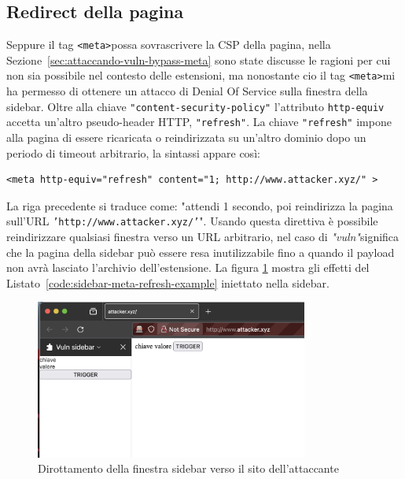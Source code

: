 \documentclass{sapthesis}
\newcommand{\code}[1]{\texttt{#1}}
\newcommand{\refSection}[1]{Sezione~\ref{#1}}
\newcommand{\refCode}[1]{Listato~\ref{#1}}
\newcommand{\vuln}{\textit{"vuln"}}
\newcommand{\tagHTML}[1]{\code{<#1>}}
\newcommand{\meta}{\tagHTML{meta}}
\begin{document}
        \subsection{Redirect della pagina}
            Seppure il tag \meta possa sovrascrivere la CSP della pagina, nella \refSection{sec:attaccando-vuln-bypass-meta}
            sono state discusse le ragioni per cui non sia possibile nel contesto delle estensioni, ma
            nonostante cio il tag \meta mi ha permesso di ottenere un attacco di Denial Of Service sulla finestra 
            della sidebar. Oltre alla chiave \code{"content-security-policy"}
            l'attributo \code{http-equiv} accetta un'altro pseudo-header HTTP, \code{"refresh"}. La chiave
            \code{"refresh"} impone alla pagina di essere ricaricata o reindirizzata su un'altro dominio dopo
            un periodo di timeout arbitrario, la sintassi appare così:
            \begin{lstlisting}[label=code:sidebar-meta-refresh-example]
                <meta http-equiv="refresh" content="1; http://www.attacker.xyz/" >
            \end{lstlisting}
            La riga precedente si traduce come: "attendi 1 secondo, poi reindirizza la pagina sull'URL 
            \code{'http://www.attacker.xyz/'}".
            Usando questa direttiva è possibile reindirizzare qualsiasi finestra verso un URL arbitrario,
            nel caso di \vuln significa che la pagina della sidebar può essere resa inutilizzabile fino a
            quando il payload non avrà lasciato l'archivio dell'estensione. La figura \ref{fig:sidebar-meta-refresh-1}
            mostra gli effetti del \refCode{code:sidebar-meta-refresh-example} iniettato nella sidebar.

            \begin{figure}
                \centering
                \includegraphics[width=0.8\textwidth]{sidebar-meta-refresh-1.png}
                \caption{Dirottamento della finestra sidebar verso il sito dell'attaccante}
                \label{fig:sidebar-meta-refresh-1}
            \end{figure}
\end{document}
